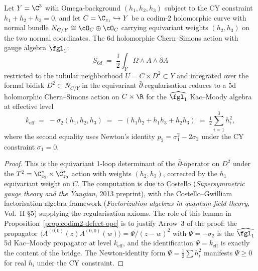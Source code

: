 \begin{lemma}
\label{lem:5d-to-6d-codim2-bridge}
Let $Y = \C^3$ with Omega-background $(h_1, h_2, h_3)$ subject to the CY constraint $h_1 + h_2 + h_3 = 0$, and let $C = \C_{z_1} \hookrightarrow Y$ be a codim-$2$ holomorphic curve with normal bundle $N_{C/Y} \cong \cO_C \oplus \cO_C$ carrying equivariant weights $(h_2, h_3)$ on the two normal coordinates. The 6d holomorphic Chern--Simons action with gauge algebra $\fgl_1$:
\[
 S_{6d} \;=\; \frac{1}{2}\int_Y \Omega \wedge A \wedge \bar{\partial} A
\]
restricted to the tubular neighborhood $U = C \times D^2 \subset Y$ and integrated over the formal bidisk $D^2 \subset N_{C/Y}$ in the equivariant $\bar{\partial}$-regularisation reduces to a 5d holomorphic Chern--Simons action on $C \times \R$ for the $\widehat{\fgl_1}$ Kac--Moody algebra at effective level
\[
 k_{\mathrm{eff}} \;=\; -\sigma_2(h_1, h_2, h_3) \;=\; -(h_1 h_2 + h_1 h_3 + h_2 h_3) \;=\; \tfrac{1}{2}\sum_{i=1}^{3} h_i^2,
\]
where the second equality uses Newton's identity $p_2 = \sigma_1^2 - 2\sigma_2$ under the CY constraint $\sigma_1 = 0$.
\end{lemma}

\begin{proof}
This is the equivariant 1-loop determinant of the $\bar{\partial}$-operator on $D^2$ under the $T^2 = \C^*_{z_2} \times \C^*_{z_3}$ action with weights $(h_2, h_3)$, corrected by the $h_1$ equivariant weight on $C$. The computation is due to Costello (\emph{Supersymmetric gauge theory and the Yangian}, 2013 preprint), with the Costello--Gwilliam factorisation-algebra framework (\emph{Factorization algebras in quantum field theory}, Vol.~II §5) supplying the regularisation axioms. The role of this lemma in Proposition~\ref{prop:codim2-defect-ope} is to justify Arrow~$3$ of the proof: the propagator $\langle A^{(0,0)}(z) A^{(0,0)}(w) \rangle = \Psi/(z-w)^2$ with $\Psi = -\sigma_2$ is the $\widehat{\fgl_1}$ 5d Kac--Moody propagator at level $k_{\mathrm{eff}}$, and the identification $\Psi = k_{\mathrm{eff}}$ is exactly the content of the bridge. The Newton-identity form $\Psi = \tfrac{1}{2}\sum h_i^2$ manifests $\Psi \geq 0$ for real $h_i$ under the CY constraint.
\end{proof}

